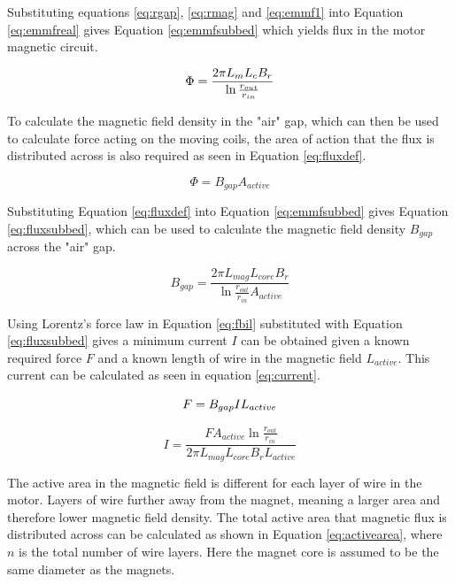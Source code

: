 \documentclass[a4paper,12pt]{article}
\begin{document}
Substituting equations \ref{eq:rgap}, \ref{eq:rmag} and \ref{eq:emmf1} into Equation \ref{eq:emmfreal} gives Equation \ref{eq:emmfsubbed} which yields flux in the motor magnetic circuit.

\begin{equation}\label{eq:emmfsubbed}
    \Phi = \frac{2\pi L_m L_c B_r}{\ln{\frac{r_{out}}{r_{in}}}}\\
\end{equation}

To calculate the magnetic field density in the "air" gap, which can then be used to calculate force acting on the moving coils, the area of action that the flux is distributed across is also required as seen in Equation \ref{eq:fluxdef}.

\begin{equation}\label{eq:fluxdef}
    \Phi = B_{gap}A_{active}
\end{equation}

Substituting Equation \ref{eq:fluxdef} into Equation \ref{eq:emmfsubbed} gives Equation \ref{eq:fluxsubbed}, which can be used to calculate the magnetic field density $B_{gap}$ across the "air" gap.

\begin{equation}\label{eq:fluxsubbed}
    B_{gap} = \frac{2\pi L_{mag} L_{core} B_r}{\ln{\frac{r_{out}}{r_{in}}}A_{active}}
\end{equation}

Using Lorentz's force law in Equation \ref{eq:fbil} substituted with Equation \ref{eq:fluxsubbed} gives a minimum current $I$ can be obtained given a known required force $F$ and a known length of wire in the magnetic field $L_{active}$. This current can be calculated as seen in equation \ref{eq:current}.

\begin{equation}\label{eq:fbil}
        F = B_{gap}IL_{active}\\
\end{equation}

\begin{equation}\label{eq:current}
    I = \frac{F A_{active} \ln{\frac{r_{out}}{r_{in}}}}{2\pi L_{mag} L_{core} B_r L_{active}}
\end{equation}

The active area in the magnetic field is different for each layer of wire in the motor. Layers of wire further away from the magnet, meaning a larger area and therefore lower magnetic field density. The total active area that magnetic flux is distributed across can be calculated as shown in Equation \ref{eq:activearea}, where $n$ is the total number of wire layers. Here the magnet core is assumed to be the same diameter as the magnets.
\end{document}
